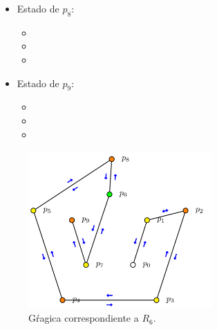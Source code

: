 \begin{multicols}{2}
\begin{itemize}
\begin{itemize}
      \item {}
      \end{itemize}

\item Estado de $p_8$:
      \begin{itemize}
      \item {}
      
      \item {}
      
      \item {}
      \end{itemize}

\item Estado de $p_9$:
      \begin{itemize}
      \item {}
      
      \item {}
      
      \item {}
      \end{itemize}

\end{itemize}
\end{multicols} 
\newpage

\begin{figure}[ht]
        \begin{center}
                \includegraphics[width=7cm]{RD6.png}
                \caption{Gŕagica correspondiente a $R_6$.}
        \end{center}
\end{figure}

